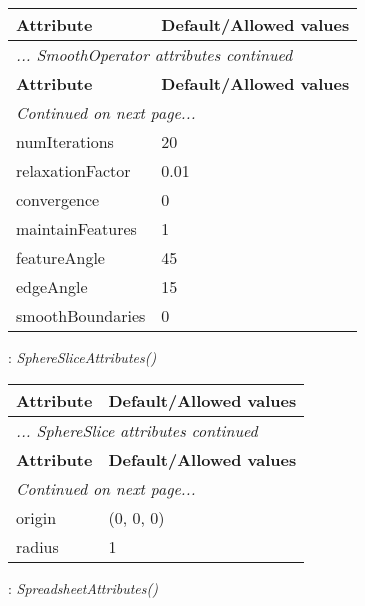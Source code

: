 \documentclass[10pt,a4paper]{report}
\begin{document}
\begin{longtable}{ll}
{\bf Attribute} & {\bf Default/Allowed values} \\
\hline \hline
\endfirsthead
\multicolumn{2}{l}{{\it ... SmoothOperator attributes continued}} \\
{\bf Attribute} & {\bf Default/Allowed values} \\
\hline \hline
\endhead
\hline
\multicolumn{2}{l}{{\it Continued on next page...}} \\
\endfoot
\hline
\endlastfoot

numIterations  &  20 \\
relaxationFactor  &  0.01 \\
convergence  &  0 \\
maintainFeatures  &  1 \\
featureAngle  &  45 \\
edgeAngle  &  15 \\
smoothBoundaries  &  0 \\
\end{longtable}

\newpage

{}
: {\it SphereSliceAttributes() }\\[-3mm]

\begin{longtable}{ll}
{\bf Attribute} & {\bf Default/Allowed values} \\
\hline \hline
\endfirsthead
\multicolumn{2}{l}{{\it ... SphereSlice attributes continued}} \\
{\bf Attribute} & {\bf Default/Allowed values} \\
\hline \hline
\endhead
\hline
\multicolumn{2}{l}{{\it Continued on next page...}} \\
\endfoot
\hline
\endlastfoot

origin  &  (0, 0, 0) \\
radius  &  1 \\
\end{longtable}

\newpage

{}
: {\it SpreadsheetAttributes() }\\[-3mm]
\end{document}
